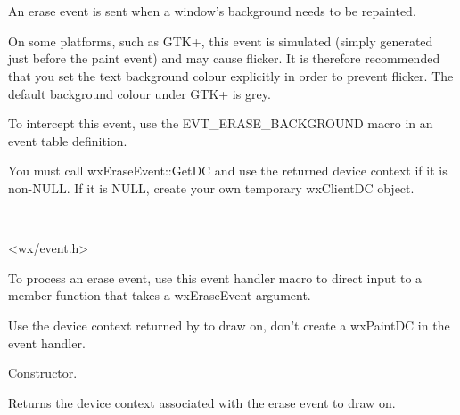\section{}\label{wxeraseevent}

An erase event is sent when a window's background needs to be repainted.

On some platforms, such as GTK+, this event is simulated (simply generated just before the
paint event) and may cause flicker. It is therefore recommended that
you set the text background colour explicitly in order to prevent flicker.
The default background colour under GTK+ is grey.

To intercept this event, use the EVT\_ERASE\_BACKGROUND macro in an event table definition.

You must call wxEraseEvent::GetDC and use the returned device context if it is non-NULL.
If it is NULL, create your own temporary wxClientDC object. 


\\


<wx/event.h>


To process an erase event, use this event handler macro to direct input to a member
function that takes a wxEraseEvent argument.

\twocolwidtha{7cm}
\begin{twocollist}\itemsep=0pt
\end{twocollist}%


Use the device context returned by  to draw on,
don't create a wxPaintDC in the event handler.




\label{wxeraseeventctor}


Constructor.

\label{wxeraseeventgetdc}


Returns the device context associated with the erase event to draw on.

